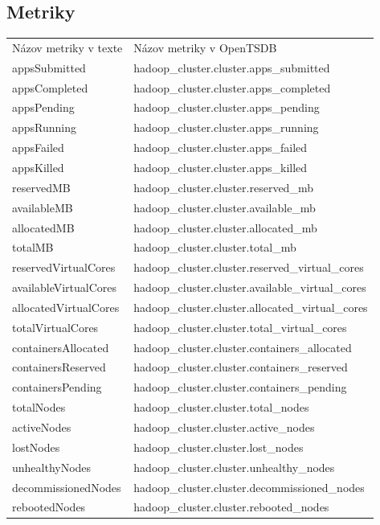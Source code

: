 \documentclass[printed,11pt,twoside,color,cover,table]{fithesis3}
\begin{document}
\begin{appendices}
\subsection{Metriky}
\begin{center}
    \begin{tabular}{| l | l |}
    \hline
    Názov metriky v texte & Názov metriky v OpenTSDB \\
	appsSubmitted & hadoop\_cluster.cluster.apps\_submitted \\ \hline
    appsCompleted & hadoop\_cluster.cluster.apps\_completed \\ \hline
    appsPending & hadoop\_cluster.cluster.apps\_pending \\ \hline
    appsRunning & hadoop\_cluster.cluster.apps\_running \\ \hline 
    appsFailed & hadoop\_cluster.cluster.apps\_failed\\ \hline
    appsKilled & hadoop\_cluster.cluster.apps\_killed\\ \hline
    reservedMB & hadoop\_cluster.cluster.reserved\_mb\\ \hline
    availableMB & hadoop\_cluster.cluster.available\_mb\\ \hline
    allocatedMB & hadoop\_cluster.cluster.allocated\_mb\\ \hline
    totalMB & hadoop\_cluster.cluster.total\_mb \\ \hline
    reservedVirtualCores & hadoop\_cluster.cluster.reserved\_virtual\_cores \\ \hline
    availableVirtualCores & hadoop\_cluster.cluster.available\_virtual\_cores \\ \hline
    allocatedVirtualCores & hadoop\_cluster.cluster.allocated\_virtual\_cores \\ \hline
    totalVirtualCores & hadoop\_cluster.cluster.total\_virtual\_cores \\ \hline
    containersAllocated & hadoop\_cluster.cluster.containers\_allocated \\ \hline
    containersReserved & hadoop\_cluster.cluster.containers\_reserved \\ \hline
    containersPending & hadoop\_cluster.cluster.containers\_pending \\ \hline
    totalNodes & hadoop\_cluster.cluster.total\_nodes \\ \hline
    activeNodes & hadoop\_cluster.cluster.active\_nodes \\ \hline
    lostNodes & hadoop\_cluster.cluster.lost\_nodes \\ \hline
    unhealthyNodes & hadoop\_cluster.cluster.unhealthy\_nodes \\ \hline
    decommissionedNodes & hadoop\_cluster.cluster.decommissioned\_nodes \\ \hline
    rebootedNodes & hadoop\_cluster.cluster.rebooted\_nodes \\ \hline
    \end{tabular}
\end{center}


\end{appendices}
\end{document}
